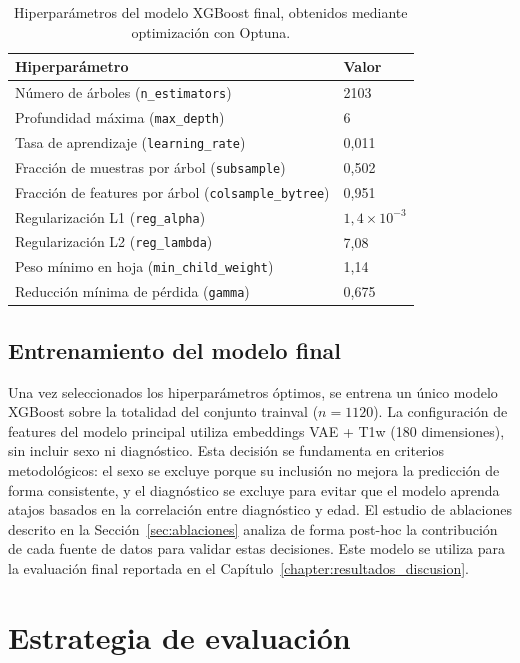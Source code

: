 \begin{table}[H]
\centering
\caption{Hiperparámetros del modelo XGBoost final, obtenidos mediante optimización con Optuna.}
\label{tab:xgb_hparams}
\begin{tabular}{ll}
\toprule
\textbf{Hiperparámetro} & \textbf{Valor} \\
\midrule
Número de árboles (\texttt{n\_estimators}) & 2103 \\
Profundidad máxima (\texttt{max\_depth}) & 6 \\
Tasa de aprendizaje (\texttt{learning\_rate}) & 0,011 \\
Fracción de muestras por árbol (\texttt{subsample}) & 0,502 \\
Fracción de features por árbol (\texttt{colsample\_bytree}) & 0,951 \\
Regularización L1 (\texttt{reg\_alpha}) & $1{,}4 \times 10^{-3}$ \\
Regularización L2 (\texttt{reg\_lambda}) & 7,08 \\
Peso mínimo en hoja (\texttt{min\_child\_weight}) & 1,14 \\
Reducción mínima de pérdida (\texttt{gamma}) & 0,675 \\
\bottomrule
\end{tabular}
\end{table}

\subsection{Entrenamiento del modelo final}

Una vez seleccionados los hiperparámetros óptimos, se entrena un único modelo XGBoost sobre la totalidad del conjunto trainval ($n = 1120$). La configuración de features del modelo principal utiliza embeddings VAE + T1w (180 dimensiones), sin incluir sexo ni diagnóstico. Esta decisión se fundamenta en criterios metodológicos: el sexo se excluye porque su inclusión no mejora la predicción de forma consistente, y el diagnóstico se excluye para evitar que el modelo aprenda atajos basados en la correlación entre diagnóstico y edad. El estudio de ablaciones descrito en la Sección~\ref{sec:ablaciones} analiza de forma post-hoc la contribución de cada fuente de datos para validar estas decisiones. Este modelo se utiliza para la evaluación final reportada en el Capítulo~\ref{chapter:resultados_discusion}.

\section{Estrategia de evaluación}
\label{sec:evaluacion}

